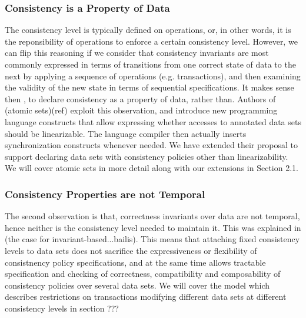 \subsubsection{Consistency is a Property of Data}
The consistency level is typically defined on operations, or, in other words, it
is the reponsibility of operations to enforce a certain consistency level.
However, we can flip this reasoning if we consider that consistency
invariants are most commonly expressed in terms of transitions from one correct
state of data to the next by applying a sequence of operations (e.g.
transactions), and then examining the validity of the new state
in terms of sequential specifications. It makes sense then , to declare
consistency as a property of data, rather than. Authors of (atomic sets)(ref) exploit this observation, and
introduce new programming language constructs that allow expressing whether
accesses to annotated data sets should be linearizable. The language compiler
then actually inserts synchronization constructs whenever needed. We have extended
their proposal to support declaring data sets with consistency policies other
than linearizability. We will cover atomic sets in more detail along with our
extensions in Section 2.1. \\

\subsubsection{Consistency Properties are not Temporal}
The second observation is that, correctness invariants over data are not temporal, hence
neither is the consistency level needed to maintain it. This was explained in (the case for
invariant-based...bailis). This means that attaching fixed consistency levels to
data sets does not sacrifice the expressiveness or flexibility of consistnency
policy specifications, and at the same time allows tractable specification and checking of
correctness, compatibility and composability of consistency policies over
several data sets. We will cover the model which describes restrictions on
transactions modifying different data sets at different consistency levels in
section ??? \\

